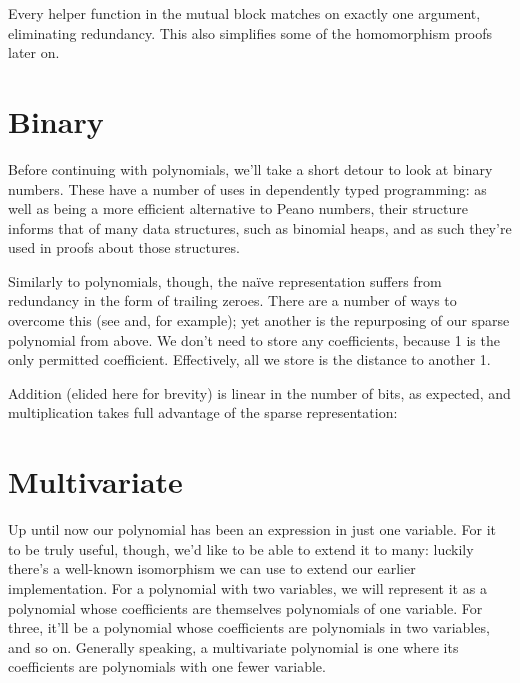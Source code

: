 \documentclass[draft, twocolumn]{article}
\theoremstyle{definition}
\theoremstyle{remark}
\begin{document}

Every helper function in the mutual block matches on exactly one argument,
eliminating redundancy. This also simplifies some of the homomorphism proofs
later on.

\section{Binary}
Before continuing with polynomials, we'll take a short detour to look at binary
numbers. These have a number of uses in dependently typed programming: as well
as being a more efficient alternative to Peano numbers, their structure informs
that of many data structures, such as binomial heaps, and as such they're used
in proofs about those structures.

Similarly to polynomials, though, the naïve representation suffers from
redundancy in the form of trailing zeroes. There are a number of ways to
overcome this (see\cite{meshveliani_binary-4_2018}
and\cite{escardo_libraries_2018}, for example); yet another is the repurposing
of our sparse polynomial from above.
We don't need to store any coefficients, because 1 is the only permitted
coefficient. Effectively, all we store is the distance to another 1.

Addition (elided here for brevity) is linear in the number of bits, as expected,
and multiplication takes full advantage of the sparse representation:
\section{Multivariate}
Up until now our polynomial has been an expression in just one variable. For it
to be truly useful, though, we'd like to be able to extend it to many: luckily
there's a well-known isomorphism we can use to extend our earlier
implementation. For a polynomial with two variables, we will represent it as a
polynomial whose coefficients are themselves polynomials of one variable. For
three, it'll be a polynomial whose coefficients are polynomials in two
variables, and so on. Generally speaking, a multivariate polynomial is one where
its coefficients are polynomials with one fewer
variable\cite{cheng_functional_2018}.
\end{document}
